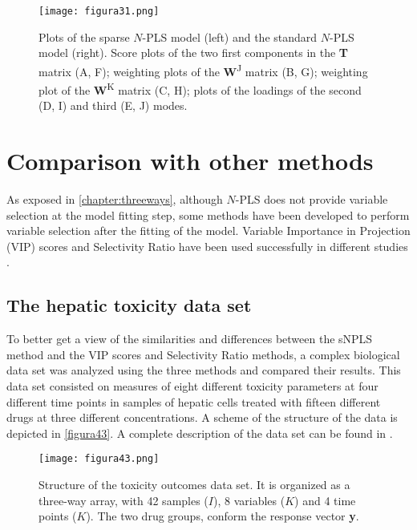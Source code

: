 \begin{figure}[hbtp]
	\centering
\texttt{[image: figura31.png]}
\caption[Plots of the sparse $N$-PLS model and the standard \textit{N}-PLS model]{Plots of the sparse $N$-PLS model (left) and the standard $N$-PLS model (right). Score plots of the two first components in the \textbf{T} matrix (A, F); weighting plots of the \textbf{W}\textsuperscript{J} matrix (B, G); weighting plot of the \textbf{W}\textsuperscript{K} matrix (C, H); plots of the loadings of the second (D, I) and third (E, J) modes.}
\label{figura31}
\end{figure}

\section{Comparison with other methods}
As exposed in \autoref{chapter:threeways}, although $N$-PLS does not provide variable selection at the model fitting step, some methods have been developed to perform variable selection after the fitting of the model. Variable Importance in Projection (VIP) scores \parencite{favilla2013assessing} and Selectivity Ratio \parencite{rajalahti2009biomarker} have been used successfully in different studies \parencite{favilla2014ranking, mostafapour2015n, yun2016variable}.

\subsection{The hepatic toxicity data set}
To better get a view of the similarities and differences between the sNPLS method and the VIP scores and Selectivity Ratio methods, a complex biological data set was analyzed using the three methods and compared their results. This data set consisted on measures of eight different toxicity parameters at four different time points in samples of hepatic cells treated with fifteen different drugs at three different concentrations. A scheme of the structure of the data is depicted in \autoref{figura43}. A complete description of the data set can be found in \textcite{tolosa2018long}. 

\begin{figure}[hbtp]
	\centering
\texttt{[image: figura43.png]}
\caption[Structure of the toxicity outcomes data set]{Structure of the toxicity outcomes data set. It is organized as a three-way array, with 42 samples ($I$), 8 variables ($K$) and 4 time points ($K$). The two drug groups,  conform the response vector \textbf{y}.}
\label{figura43}
\end{figure}

